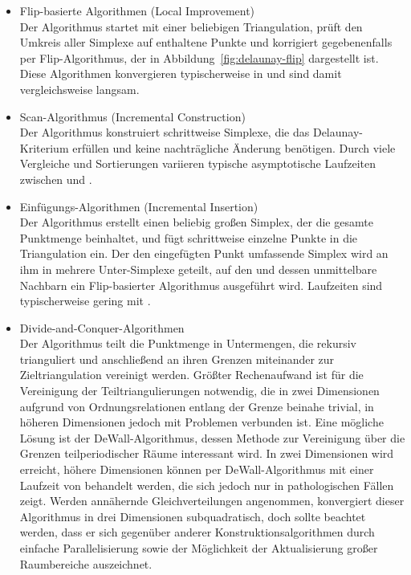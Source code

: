 \begin{itemize}
\item Flip-basierte Algorithmen (Local Improvement)\\
  Der Algorithmus startet mit einer beliebigen Triangulation, prüft den Umkreis aller Simplexe auf enthaltene Punkte und korrigiert gegebenenfalls per Flip-Algorithmus, der in Abbildung~\ref{fig:delaunay-flip} dargestellt ist.
  Diese Algorithmen konvergieren typischerweise in  und sind damit vergleichsweise langsam.

\item Scan-Algorithmus (Incremental Construction)\\
  Der Algorithmus konstruiert schrittweise Simplexe, die das Delaunay-Kriterium erfüllen und keine nachträgliche Änderung benötigen.
  Durch viele Vergleiche und Sortierungen variieren typische asymptotische Laufzeiten zwischen  und .

\item Einfügungs-Algorithmen (Incremental Insertion)\\
  Der Algorithmus erstellt einen beliebig großen Simplex, der die gesamte Punktmenge beinhaltet, und fügt schrittweise einzelne Punkte in die Triangulation ein.
  Der den eingefügten Punkt umfassende Simplex wird an ihm in mehrere Unter-Simplexe geteilt, auf den und dessen unmittelbare Nachbarn ein Flip-basierter Algorithmus ausgeführt wird.
  Laufzeiten sind typischerweise gering mit .

\item Divide-and-Conquer-Algorithmen\\
  Der Algorithmus teilt die Punktmenge in Untermengen, die rekursiv trianguliert und anschließend an ihren Grenzen miteinander zur Zieltriangulation vereinigt werden.
  Größter Rechenaufwand ist für die Vereinigung der Teiltriangulierungen notwendig, die in zwei Dimensionen aufgrund von Ordnungsrelationen entlang der Grenze beinahe trivial, in höheren Dimensionen jedoch mit Problemen verbunden ist.
  Eine mögliche Lösung ist der DeWall-Algorithmus\cite{cignoni_dewall:_1998}, dessen Methode zur Vereinigung über die Grenzen teilperiodischer Räume interessant wird.
  In zwei Dimensionen wird  erreicht, höhere Dimensionen können per DeWall-Algorithmus mit einer Laufzeit von  behandelt werden, die sich jedoch nur in pathologischen Fällen zeigt.
  Werden annähernde Gleichverteilungen angenommen, konvergiert dieser Algorithmus in drei Dimensionen subquadratisch, doch sollte beachtet werden, dass er sich gegenüber anderer Konstruktionsalgorithmen durch einfache Parallelisierung sowie der Möglichkeit der Aktualisierung großer Raumbereiche auszeichnet.


\end{itemize}
